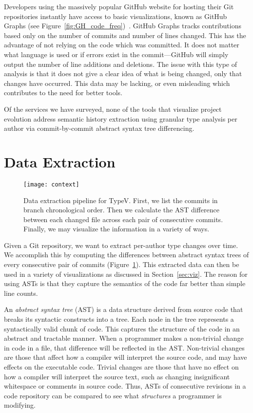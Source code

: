 Developers using the massively popular GitHub website for hosting their Git repositories instantly have access to basic visualizations, known as GitHub Graphs (see Figure~\ref{fig:GH_code_freq})~\cite{github-graphs}. GitHub Graphs tracks contributions based only on the number of commits and number of lines changed. This has the advantage of not relying on the code which was committed. It does not matter what language is used or if errors exist in the commit---GitHub will simply output the number of line additions and deletions. The issue with this type of analysis is that it does not give a clear idea of what is being changed, only that changes have occurred. This data may be lacking, or even misleading which contributes to the need for better tools.

Of the services we have surveyed, none of the tools that visualize project evolution address semantic history extraction using granular type analysis per author via commit-by-commit abstract syntax tree differencing.

\section{Data Extraction}
\label{sec:methodology}

\begin{figure}[!h]
\centering
\texttt{[image: context]}
\caption{Data extraction pipeline for TypeV. First, we list the commits in branch chronological order. Then we calculate the AST difference between each changed file across each pair of consecutive commits. Finally, we may visualize the information in a variety of ways.}
\label{fig:context}
\end{figure}

Given a Git repository, we want to extract per-author type changes over time. We accomplish this by computing the differences between abstract syntax trees of every consecutive pair of commits (Figure~\ref{fig:context}). This extracted data can then be used in a variety of visualizations as discussed in Section~\ref{sec:viz}. The reason for using ASTs is that they capture the semantics of the code far better than simple line counts.

An \emph{abstract syntax tree} (AST) is a data structure derived from source code that breaks its syntactic constructs into a tree. Each node in the tree represents a syntactically valid chunk of code. This captures the structure of the code in an abstract and tractable manner. When a programmer makes a non-trivial change in code in a file, that difference will be reflected in the AST\@. Non-trivial changes are those that affect how a compiler will interpret the source code, and may have effects on the executable code. Trivial changes are those that have no effect on how a compiler will interpret the source text, such as changing insignificant whitespace or comments in source code. Thus, ASTs of consecutive revisions in a code repository can be compared to see what \emph{structures} a programmer is modifying.

